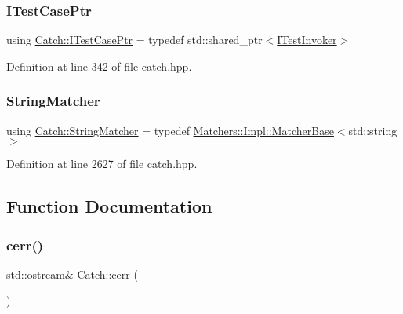 \subsubsection{\texorpdfstring{I\+Test\+Case\+Ptr}{ITestCasePtr}}
{\footnotesize\ttfamily using \mbox{\hyperlink{namespace_catch_afa04ebe8e9423240c9585f7101a82ddf}{Catch\+::\+I\+Test\+Case\+Ptr}} = typedef std\+::shared\+\_\+ptr$<$\mbox{\hyperlink{struct_catch_1_1_i_test_invoker}{I\+Test\+Invoker}}$>$}



Definition at line 342 of file catch.\+hpp.

\mbox{\label{namespace_catch_aba438977e831821a2eeca82b9b4f4af2}} 
\subsubsection{\texorpdfstring{String\+Matcher}{StringMatcher}}
{\footnotesize\ttfamily using \mbox{\hyperlink{namespace_catch_aba438977e831821a2eeca82b9b4f4af2}{Catch\+::\+String\+Matcher}} = typedef \mbox{\hyperlink{struct_catch_1_1_matchers_1_1_impl_1_1_matcher_base}{Matchers\+::\+Impl\+::\+Matcher\+Base}}$<$std\+::string$>$}



Definition at line 2627 of file catch.\+hpp.



\subsection{Function Documentation}
\mbox{\label{namespace_catch_a4e5b5dc07abdfa30de33593dfab71f43}} 
\subsubsection{\texorpdfstring{cerr()}{cerr()}}
{\footnotesize\ttfamily std\+::ostream\& Catch\+::cerr (\begin{DoxyParamCaption}{ }\end{DoxyParamCaption})}

\mbox{\label{namespace_catch_a0f78e9afdebc6d4512d18e76fbf54b8c}} 
